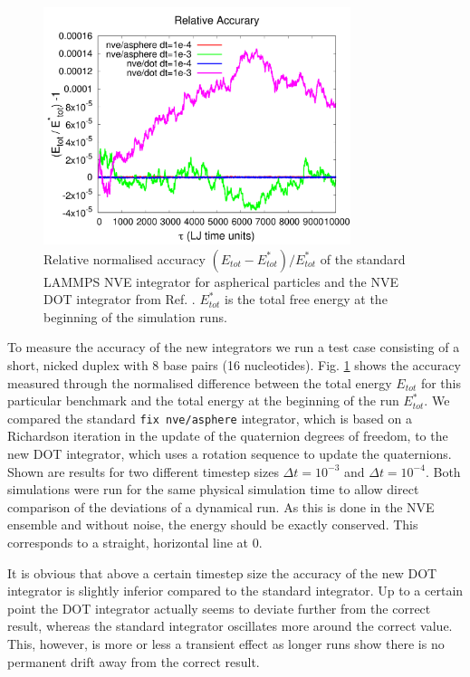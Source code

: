 \documentclass[12pt,onecolumn]{article}
\begin{document}
\begin{figure}[htpb]
\begin{center}
\includegraphics[width=0.8\textwidth]{./pics/etot_nve_asphere_dot.pdf}
\caption{\label{integrator} Relative normalised accuracy $(E_{tot}-E^*_{tot})/E^*_{tot}$ of the standard LAMMPS NVE integrator 
for aspherical particles and the NVE DOT integrator from Ref. \cite{Davidchack:2015}. $E^*_{tot}$ is the total free energy 
at the beginning of the simulation runs.}
\end{center}
\end{figure}

\noindent To measure the accuracy of the new integrators we run a test case consisting of a short, 
nicked duplex with 8 base pairs (16 nucleotides). 
Fig. \ref{integrator} shows the accuracy measured through the normalised difference between the total energy $E_{tot}$ for
this particular benchmark and the total energy at the beginning of the run $E_{tot}^*$. 
We compared the standard \texttt{fix nve/asphere} integrator, 
which is based on a Richardson iteration in the update of the quaternion degrees of freedom, to the new DOT integrator, 
which uses a rotation sequence to update the quaternions. Shown are results for two different timestep sizes
$\Delta t=10^{-3}$ and $\Delta t=10^{-4}$. Both simulations were run for the same physical simulation time to allow
 direct comparison of the deviations of a dynamical run. As this is done in the NVE ensemble and without noise, 
the energy should be exactly conserved. This corresponds to a straight, horizontal line at 0.

It is obvious that above a certain timestep size the accuracy of the new DOT integrator is slightly 
inferior compared to the standard integrator. Up to a certain point the DOT integrator actually seems to deviate 
further from the correct result, whereas the standard integrator oscillates more around the correct value. 
This, however, is more or less a transient effect as longer runs show there is no permanent drift away from the correct
result. 
\end{document}
